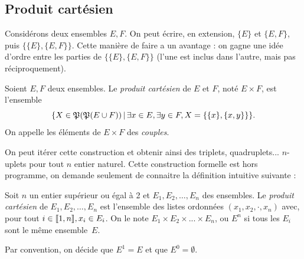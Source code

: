 \subsection{Produit cartésien}

Considérons deux ensembles $E, F$. On peut écrire, en extension, $\{E\}$ et $\{E, F\}$, puis $\{\{E\}, \{E, F\}\}$. Cette manière de faire a un avantage : on gagne une idée d'ordre entre les parties de $\{\{E\}, \{E, F\}\}$ (l'une est inclus dans l'autre, mais pas réciproquement). 

\begin{dftn}
    Soient $E, F$ deux ensembles. Le \emph{produit cartésien} de $E$ et $F$, noté $E \times F$, est l'ensemble 
    $$\{X \in \mathfrak{P}(\mathfrak{P}(E \cup F)) \,\vert\, \exists x \in E, \exists y \in F, X = \{\{x\}, \{x, y\}\}\}.$$
    On appelle les éléments de $E \times F$ des \emph{couples}. 
\end{dftn}

On peut itérer cette construction et obtenir ainsi des triplets, quadruplets... $n$-uplets pour tout $n$ entier naturel.
Cette construction formelle est hors programme, on demande seulement de connaitre la définition intuitive suivante :

\begin{dftn}
    Soit $n$ un entier supérieur ou égal à 2 et $E_1, E_2, \dots, E_n$ des ensembles. Le \emph{produit cartésien} de $E_1, E_2, \dots, E_n$ est l'ensemble des listes ordonnées $(x_1, x_2, \cdot, x_n)$ avec, pour tout $i \in \llbracket {1, n} \rrbracket, x_i\in E_i$. On le note $E_1\times E_2 \times ... \times E_n$, ou $E^n$ si tous les $E_i$ sont le même ensemble~$E$.
\end{dftn}

Par convention, on décide que $E^1 = E$ et que $E^0 = \emptyset$.

